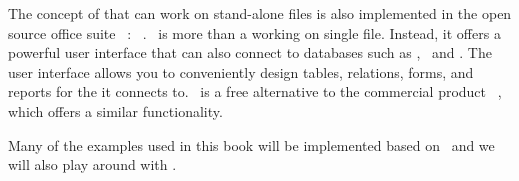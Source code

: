 The concept of  that can work on stand-alone files is also implemented in the open source office suite \libreoffice~\cite{DF2024LTDF,GL2012LTSOOSSCBAFACSOL,S2022L7PFEUU}: \libreofficeBase~\cite{FNFHWSKLSSGLFRSRPLJG2022BG7R1BOL7C,S2022L7PFEUU}.
\libreofficeBase\ is more than a  working on single file.
Instead, it offers a powerful user interface that can also connect to databases such as \mysql, \mariadb\ and \postgresql.
The user interface allows you to conveniently design tables, relations, forms, and reports for the  it connects to.
\libreofficeBase\ is a free alternative to the commercial product \microsoftAccess~\cite{SSI2023MA2BTA,B2020HOMA2,UC2021AFD}, which offers a similar functionality.

Many of the examples used in this book will be implemented based on \postgresql\ and we will also play around with \libreofficeBase.%
%
\endhsection
%
\endhsection%
%

